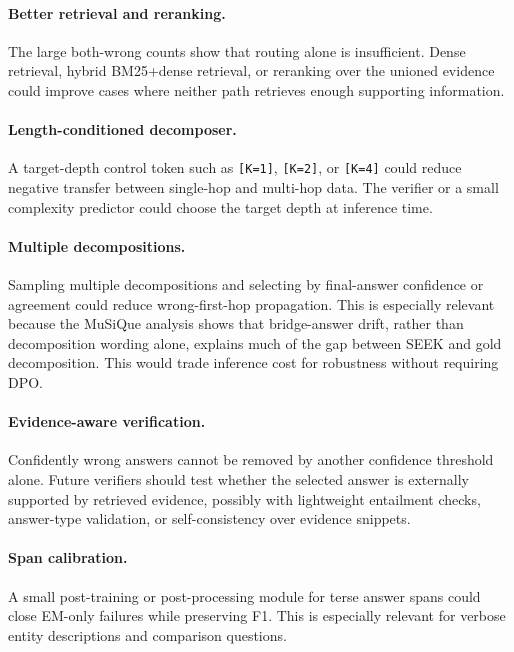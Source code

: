\paragraph{Better retrieval and reranking.} The large both-wrong counts show that routing alone is insufficient. Dense retrieval, hybrid BM25+dense retrieval, or reranking over the unioned evidence could improve cases where neither path retrieves enough supporting information.

\paragraph{Length-conditioned decomposer.} A target-depth control token such as \texttt{[K=1]}, \texttt{[K=2]}, or \texttt{[K=4]} could reduce negative transfer between single-hop and multi-hop data. The verifier or a small complexity predictor could choose the target depth at inference time.

\paragraph{Multiple decompositions.} Sampling multiple decompositions and selecting by final-answer confidence or agreement could reduce wrong-first-hop propagation. This is especially relevant because the MuSiQue analysis shows that bridge-answer drift, rather than decomposition wording alone, explains much of the gap between SEEK and gold decomposition. This would trade inference cost for robustness without requiring DPO.

\paragraph{Evidence-aware verification.} Confidently wrong answers cannot be removed by another confidence threshold alone. Future verifiers should test whether the selected answer is externally supported by retrieved evidence, possibly with lightweight entailment checks, answer-type validation, or self-consistency over evidence snippets.

\paragraph{Span calibration.} A small post-training or post-processing module for terse answer spans could close EM-only failures while preserving F1. This is especially relevant for verbose entity descriptions and comparison questions.
